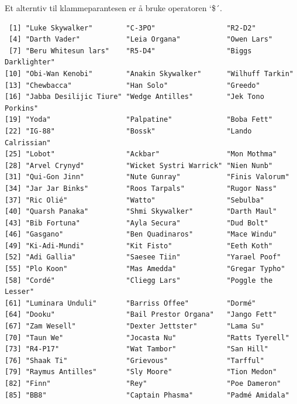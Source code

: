 \documentclass[
  letterpaper,
  DIV=11,
  numbers=noendperiod]{scrartcl}
\newenvironment{Shaded}{\begin{snugshade}}{\end{snugshade}}
\newcommand{\CommentTok}[1]{\textcolor[rgb]{0.37,0.37,0.37}{#1}}
\newcommand{\NormalTok}[1]{\textcolor[rgb]{0.00,0.23,0.31}{#1}}
\newcommand{\SpecialCharTok}[1]{\textcolor[rgb]{0.37,0.37,0.37}{#1}}
\begin{document}
Et alterntiv til klammeparantesen er å bruke operatoren `\$´.

\begin{Shaded}
\end{Shaded}

\begin{verbatim}
 [1] "Luke Skywalker"        "C-3PO"                 "R2-D2"                
 [4] "Darth Vader"           "Leia Organa"           "Owen Lars"            
 [7] "Beru Whitesun lars"    "R5-D4"                 "Biggs Darklighter"    
[10] "Obi-Wan Kenobi"        "Anakin Skywalker"      "Wilhuff Tarkin"       
[13] "Chewbacca"             "Han Solo"              "Greedo"               
[16] "Jabba Desilijic Tiure" "Wedge Antilles"        "Jek Tono Porkins"     
[19] "Yoda"                  "Palpatine"             "Boba Fett"            
[22] "IG-88"                 "Bossk"                 "Lando Calrissian"     
[25] "Lobot"                 "Ackbar"                "Mon Mothma"           
[28] "Arvel Crynyd"          "Wicket Systri Warrick" "Nien Nunb"            
[31] "Qui-Gon Jinn"          "Nute Gunray"           "Finis Valorum"        
[34] "Jar Jar Binks"         "Roos Tarpals"          "Rugor Nass"           
[37] "Ric Olié"              "Watto"                 "Sebulba"              
[40] "Quarsh Panaka"         "Shmi Skywalker"        "Darth Maul"           
[43] "Bib Fortuna"           "Ayla Secura"           "Dud Bolt"             
[46] "Gasgano"               "Ben Quadinaros"        "Mace Windu"           
[49] "Ki-Adi-Mundi"          "Kit Fisto"             "Eeth Koth"            
[52] "Adi Gallia"            "Saesee Tiin"           "Yarael Poof"          
[55] "Plo Koon"              "Mas Amedda"            "Gregar Typho"         
[58] "Cordé"                 "Cliegg Lars"           "Poggle the Lesser"    
[61] "Luminara Unduli"       "Barriss Offee"         "Dormé"                
[64] "Dooku"                 "Bail Prestor Organa"   "Jango Fett"           
[67] "Zam Wesell"            "Dexter Jettster"       "Lama Su"              
[70] "Taun We"               "Jocasta Nu"            "Ratts Tyerell"        
[73] "R4-P17"                "Wat Tambor"            "San Hill"             
[76] "Shaak Ti"              "Grievous"              "Tarfful"              
[79] "Raymus Antilles"       "Sly Moore"             "Tion Medon"           
[82] "Finn"                  "Rey"                   "Poe Dameron"          
[85] "BB8"                   "Captain Phasma"        "Padmé Amidala"        
\end{verbatim}
\end{document}
